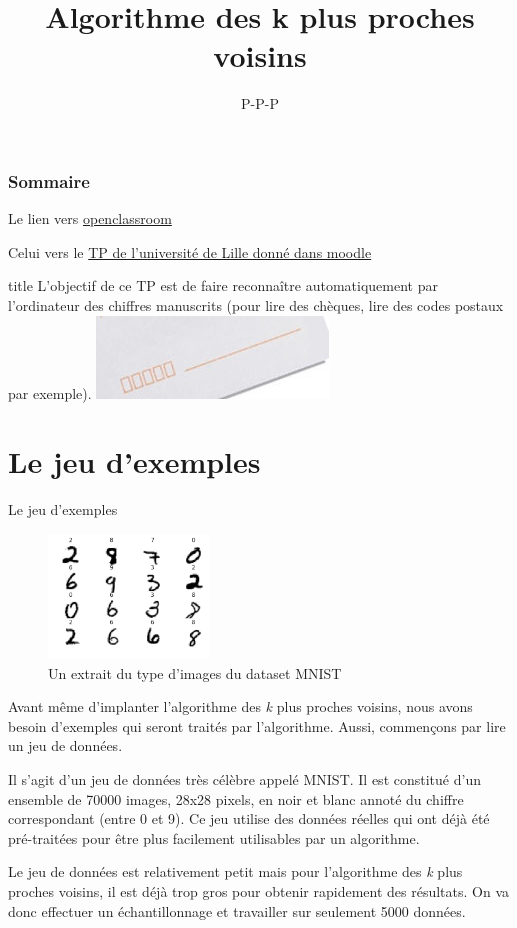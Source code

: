 \documentclass[usenames,dvipsnames,hyperref={pdfpagemode=FullScreen},9pt,t]{beamer}
\title{Algorithme des k plus proches voisins}
\author{P-P-P}
\begin{document}
    	\frame{\titlepage}
    
    \frametitle{Sommaire}
    \begin{frame}
    \tableofcontents{}
    Le lien vers
    \href{https://openclassrooms.com/fr/courses/4011851-initiez-vous-au-machine-learning/4022441-tp-entrainez-le-modele-des-k-plus-proches-voisins-k-nn}{openclassroom}
    
    Celui vers le
    \href{http://www.grappa.univ-lille3.fr/~ppreux/ensg/miashs/l3-ap/tps/kppv/}{TP
        de l'université de Lille donné dans moodle}
\end{frame}
    

\begin{frame}{title}
L'objectif de ce TP est de faire reconnaître automatiquement par
l'ordinateur des chiffres manuscrits (pour lire des chèques, lire des
codes postaux par exemple). \includegraphics{lettres.jpg}
\end{frame}



    
\section{Le  jeu d'exemples}
\begin{frame}{Le jeu d'exemples}
    \begin{figure}
    \centering
    \includegraphics[width=0.38\textwidth]{extrait_MNIST2.png}
    \caption{\scriptsize Un extrait du type d'images du dataset MNIST}
\end{figure}

Avant même d'implanter l'algorithme des \emph{k} plus proches voisins,
nous avons besoin d'exemples qui seront traités par l'algorithme. Aussi,
commençons par lire un jeu de données.

Il s'agit d'un jeu de données très célèbre appelé MNIST. Il est
constitué d'un ensemble de 70000 images, 28x28 pixels, en noir et blanc
annoté du chiffre correspondant (entre 0 et 9). Ce jeu utilise des
données réelles qui ont déjà été pré-traitées pour être plus facilement
utilisables par un algorithme.


Le jeu de données est relativement petit mais pour l'algorithme des
\emph{k} plus proches voisins, il est déjà trop gros pour obtenir
rapidement des résultats. On va donc effectuer un échantillonnage et
travailler sur seulement 5000 données.
\end{frame}
\end{document}
